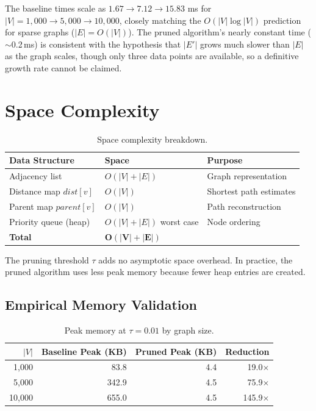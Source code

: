 \noindent The baseline times scale as $1.67 \to 7.12 \to 15.83$ ms for $|V|=1{,}000 \to 5{,}000 \to 10{,}000$, closely matching the $O(|V|\log|V|)$ prediction for sparse graphs ($|E|=O(|V|)$). The pruned algorithm's nearly constant time ($\sim$0.2\,ms) is consistent with the hypothesis that $|E'|$ grows much slower than $|E|$ as the graph scales, though only three data points are available, so a definitive growth rate cannot be claimed.

\section{Space Complexity}

\begin{table}[htbp]
\centering
\renewcommand{\arraystretch}{1.3}
\begin{tabular}{@{}lll@{}}
\toprule
\textbf{Data Structure} & \textbf{Space} & \textbf{Purpose} \\
\midrule
Adjacency list & $O(|V|+|E|)$ & Graph representation \\
Distance map $\mathit{dist}[v]$ & $O(|V|)$ & Shortest path estimates \\
Parent map $\mathit{parent}[v]$ & $O(|V|)$ & Path reconstruction \\
Priority queue (heap) & $O(|V|+|E|)$ worst case & Node ordering \\
\midrule
\textbf{Total} & $\mathbf{O(|V|+|E|)}$ & \\
\bottomrule
\end{tabular}
\caption[Space complexity breakdown]{Space complexity breakdown.}
\label{table:space_complexity}
\end{table}

The pruning threshold $\tau$ adds no asymptotic space overhead. In practice, the pruned algorithm uses less peak memory because fewer heap entries are created.

\subsection{Empirical Memory Validation}

\begin{table}[htbp]
\centering
\renewcommand{\arraystretch}{1.3}
\begin{tabular}{@{}rrrr@{}}
\toprule
$|V|$ & \textbf{Baseline Peak (KB)} & \textbf{Pruned Peak (KB)} & \textbf{Reduction} \\
\midrule
1,000  & 83.8 & 4.4 & 19.0$\times$ \\
5,000  & 342.9 & 4.5 & 75.9$\times$ \\
10,000 & 655.0 & 4.5 & 145.9$\times$ \\
\bottomrule
\end{tabular}
\caption[Peak memory scaling by graph size]{Peak memory at $\tau=0.01$ by graph size.}
\label{table:memory_by_size}
\end{table}

